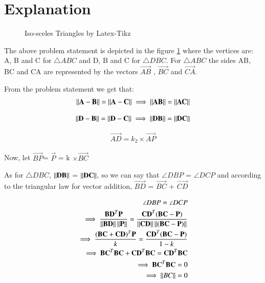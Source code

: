 \documentclass[journal,12pt,twocolumn]{IEEEtran}
\begin{document}
\section{Explanation}
\begin{figure}[!ht]
\centering
\resizebox{\columnwidth}{!}{}
\caption{Iso-sceles Triangles by Latex-Tikz}
\label{fig:iso_scelen}	
\end{figure}

The above problem statement is depicted in the figure \ref{fig:iso_scelen} where the vertices are: A, B and C for $\triangle ABC$ and D, B and C for $\triangle DBC$. For $\triangle ABC$ the sides AB, BC and CA are represented by the vectors $\vec{AB}$ , $\vec{BC}$ and $\vec{CA}$.

From the problem statement we get that:
\begin{align}
\left\lVert\mathbf{A}-\mathbf{B}\right\rVert = \left\lVert\mathbf{A}-\mathbf{C}\right\rVert
\implies \left\lVert\mathbf{AB}\right\rVert = \left\lVert\mathbf{AC}\right\rVert
\end{align}
\label{cond1}

\begin{align}
\left\lVert\mathbf{D}-\mathbf{B}\right\rVert = \left\lVert\mathbf{D}-\mathbf{C}\right\rVert
\implies \left\lVert\mathbf{DB}\right\rVert = \left\lVert\mathbf{DC}\right\rVert
\end{align}
\label{cond2}

\begin{align}
\vec{AD} = k_2 \times \vec{AP}
\end{align}

Now, let $\vec{BP}$= $\vec{P}$ = k $\times \vec{BC}$

As for $\triangle DBC$, $\left\lVert\mathbf{DB}\right\rVert$ = $\left\lVert\mathbf{DC}\right\rVert$, so we can say that $\angle DBP$ = $\angle DCP$ and according to the triangular law for vector addition, $\vec{BD}$ = $\vec{BC}$ + $\vec{CD}$

\begin{align}
\angle DBP = \angle DCP\\
\implies \frac{\mathbf{BD}^T \mathbf{P}}{\left\lVert\mathbf{BD}\right\rVert\left\lVert\mathbf{P}\right\rVert}=\frac{\mathbf{CD}^T (\mathbf{BC} - \mathbf{P})}{\left\lVert\mathbf{CD}\right\rVert\left\lVert(\mathbf{BC} - \mathbf{P})\right\rVert}\\
\implies \frac{(\mathbf{BC} + \mathbf{CD})^T \mathbf{P}}{k}=\frac{\mathbf{CD}^T (\mathbf{BC} - \mathbf{P})}{1-k}\\
\implies \mathbf{BC}^T \mathbf{BC} + \mathbf{CD}^T \mathbf{BC} = \mathbf{CD}^T \mathbf{BC}\\
\implies \mathbf{BC}^T \mathbf{BC} = 0\\
\implies \left\lVert BC\right\rVert = 0
\end{align}
\end{document}
